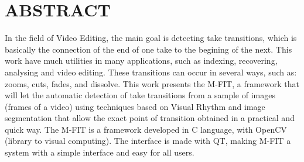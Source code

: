 \chapter*{\centering ABSTRACT \label{abstract}}

\hspace*{1.25cm}In the field of Video Editing, the main goal is
detecting take transitions, which is basically the
connection of the end of one take to the begining of the next. This work
have much utilities in many applications, such as indexing, recovering,
analysing and video editing. These transitions can occur in several
ways, such as: zooms, cuts, fades, and dissolve. This work presents
the M-FIT, a framework that will let the
automatic detection of take transitions from a sample of images
(frames of a video) using techniques based on Visual Rhythm and
image segmentation that allow the exact point of transition 
obtained in a practical and quick way. The M-FIT is a framework
developed in C language, with OpenCV (library to visual computing).
The interface is made with QT, making M-FIT a system with a simple
interface and easy for all users.
